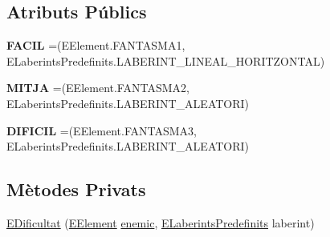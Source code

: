 \subsection*{Atributs Públics}
\begin{DoxyCompactItemize}
\item 
\hypertarget{enumlogica_1_1_usuari_1_1_e_dificultat_ab12af0e2e09e63a82f022de586b48ad4}{{\bfseries F\+A\+C\+I\+L} =(E\+Element.\+F\+A\+N\+T\+A\+S\+M\+A1, E\+Laberints\+Predefinits.\+L\+A\+B\+E\+R\+I\+N\+T\+\_\+\+L\+I\+N\+E\+A\+L\+\_\+\+H\+O\+R\+I\+T\+Z\+O\+N\+T\+A\+L)}\label{enumlogica_1_1_usuari_1_1_e_dificultat_ab12af0e2e09e63a82f022de586b48ad4}

\item 
\hypertarget{enumlogica_1_1_usuari_1_1_e_dificultat_aec3529245046d095cdfdc430347d13c4}{{\bfseries M\+I\+T\+J\+A} =(E\+Element.\+F\+A\+N\+T\+A\+S\+M\+A2, E\+Laberints\+Predefinits.\+L\+A\+B\+E\+R\+I\+N\+T\+\_\+\+A\+L\+E\+A\+T\+O\+R\+I)}\label{enumlogica_1_1_usuari_1_1_e_dificultat_aec3529245046d095cdfdc430347d13c4}

\item 
\hypertarget{enumlogica_1_1_usuari_1_1_e_dificultat_acbd66c8d29b27cec547da884f43dcdce}{{\bfseries D\+I\+F\+I\+C\+I\+L} =(E\+Element.\+F\+A\+N\+T\+A\+S\+M\+A3, E\+Laberints\+Predefinits.\+L\+A\+B\+E\+R\+I\+N\+T\+\_\+\+A\+L\+E\+A\+T\+O\+R\+I)}\label{enumlogica_1_1_usuari_1_1_e_dificultat_acbd66c8d29b27cec547da884f43dcdce}

\end{DoxyCompactItemize}
\subsection*{Mètodes Privats}
\begin{DoxyCompactItemize}
\item 
\hyperlink{enumlogica_1_1_usuari_1_1_e_dificultat_aa5b48192e546d9be47e1ae72eb856502}{E\+Dificultat} (\hyperlink{enumlogica_1_1enumeracions_1_1_e_element}{E\+Element} \hyperlink{enumlogica_1_1_usuari_1_1_e_dificultat_ad8be0bd10f87048f7545bbfa4530463c}{enemic}, \hyperlink{enumlogica_1_1enumeracions_1_1_e_laberints_predefinits}{E\+Laberints\+Predefinits} laberint)
\end{DoxyCompactItemize}
